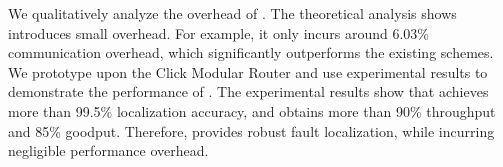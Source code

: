 We qualitatively analyze the overhead of \name{}. The theoretical analysis shows \name{} introduces small overhead. For example, it only incurs around 6.03\% communication overhead, which significantly outperforms the existing schemes. %
We prototype \name{} upon the Click Modular Router and use experimental results to demonstrate the performance of \name{}. The experimental results show that \name{} achieves more than 99.5\% localization accuracy, and obtains more than 90\% throughput and 85\% goodput. %
Therefore, \name{} provides robust fault localization, while incurring negligible performance overhead. 

